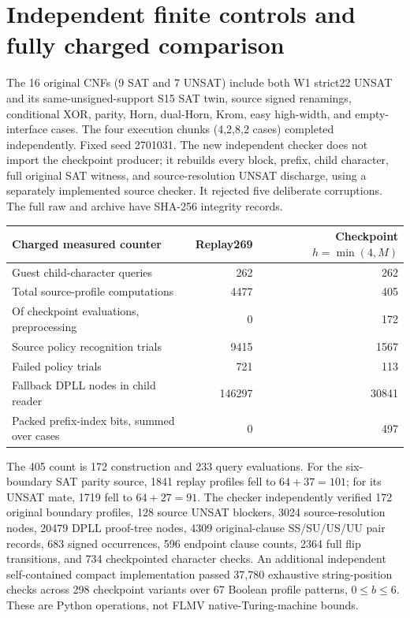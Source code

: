 \documentclass[11pt]{article}
\begin{document}
\section{Independent finite controls and fully charged comparison}
The 16 original CNFs (9 SAT and 7 UNSAT) include both W1 strict22
UNSAT and its same-unsigned-support S15 SAT twin, source signed
renamings, conditional XOR, parity, Horn, dual-Horn, Krom, easy
high-width, and empty-interface cases. The four execution chunks
(4,2,8,2 cases) completed independently. Fixed seed 2701031.
The new independent checker does not import the checkpoint producer;
it rebuilds every block, prefix, child character, full original
SAT witness, and source-resolution UNSAT discharge, using a separately
implemented source checker. It rejected five deliberate corruptions.
The full raw and archive have SHA-256 integrity records.
\begin{center}\small
\begin{tabular}{lrr}\toprule
Charged measured counter & Replay269 & Checkpoint $h=\min(4,M)$\\\midrule
Guest child-character queries & 262 & 262\\
Total source-profile computations & 4477 & 405\\
Of checkpoint evaluations, preprocessing & 0 & 172\\
Source policy recognition trials & 9415 & 1567\\
Failed policy trials & 721 & 113\\
Fallback DPLL nodes in child reader & 146297 & 30841\\
Packed prefix-index bits, summed over cases & 0 & 497\\\bottomrule
\end{tabular}
\end{center}
The 405 count is 172 construction and 233 query evaluations.
For the six-boundary SAT parity source, 1841 replay profiles fell
to $64+37=101$; for its UNSAT mate, 1719 fell to $64+27=91$.
The checker independently verified 172 original boundary profiles,
128 source UNSAT blockers, 3024 source-resolution nodes, 20479
DPLL proof-tree nodes, 4309 original-clause SS/SU/US/UU pair records,
683 signed occurrences, 596 endpoint clause counts, 2364 full
flip transitions, and 734 checkpointed character checks. An
additional independent self-contained compact implementation passed
37,780 exhaustive string-position checks across 298 checkpoint
variants over 67 Boolean profile patterns, $0\le b\le6$.
These are Python operations, not FLMV native-Turing-machine bounds.
\end{document}
